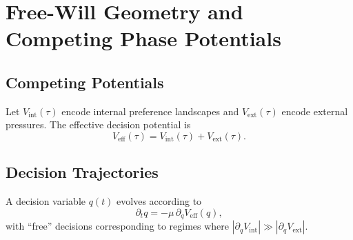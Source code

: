 \chapter{Free-Will Geometry and Competing Phase Potentials}

\section{Competing Potentials}
Let \(V_{\mathrm{int}}(\tau)\) encode internal preference landscapes and \(V_{\mathrm{ext}}(\tau)\) encode external pressures.
The effective decision potential is
\[
V_{\mathrm{eff}}(\tau) = V_{\mathrm{int}}(\tau) + V_{\mathrm{ext}}(\tau).
\]

\section{Decision Trajectories}
A decision variable \(q(t)\) evolves according to
\[
\partial_t q = -\mu\,\partial_q V_{\mathrm{eff}}(q),
\]
with “free” decisions corresponding to regimes where \(|\partial_q V_{\mathrm{int}}| \gg |\partial_q V_{\mathrm{ext}}|\).

